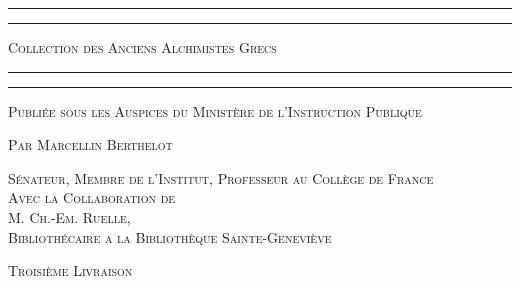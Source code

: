 \documentclass[a4paper, 11pt, oneside, polutonikogreek, french]{article}
\begin{document}
\renewcommand{\thefootnote}{{\tiny\arabic{footnote}}}
\begin{titlepage} %
	\centering %

	
	\rule{\textwidth}{1.6pt}\vspace*{-\baselineskip}\vspace*{2pt} %
	\rule{\textwidth}{0.4pt} %
	
	\vspace{1\baselineskip} %
	
	{\scshape\Huge Collection des Anciens Alchimistes Grecs}
	
	\vspace{1\baselineskip} %

	\rule{\textwidth}{0.4pt}\vspace*{-\baselineskip}\vspace{3.2pt} %
	\rule{\textwidth}{1.6pt} %
	
	\vspace{1\baselineskip} %
	
	
	{\scshape \normalsize Publiée sous les Auspices du Ministère de l'Instruction Publique}
	
	{\scshape Par \Large Marcellin Berthelot} %
	
	\vspace*{1\baselineskip} %
	
        {\scshape\scriptsize Sénateur, Membre de l'Institut, Professeur au Collège de France \\Avec la Collaboration de \\\large M. Ch.-Em. Ruelle,\\\scriptsize Bibliothécaire a la Bibliothèque Sainte-Geneviève} %
  
        \vspace{4\baselineskip}
  
	{\scshape \normalsize Troisième Livraison} %
  


\end{titlepage}
\end{document}
